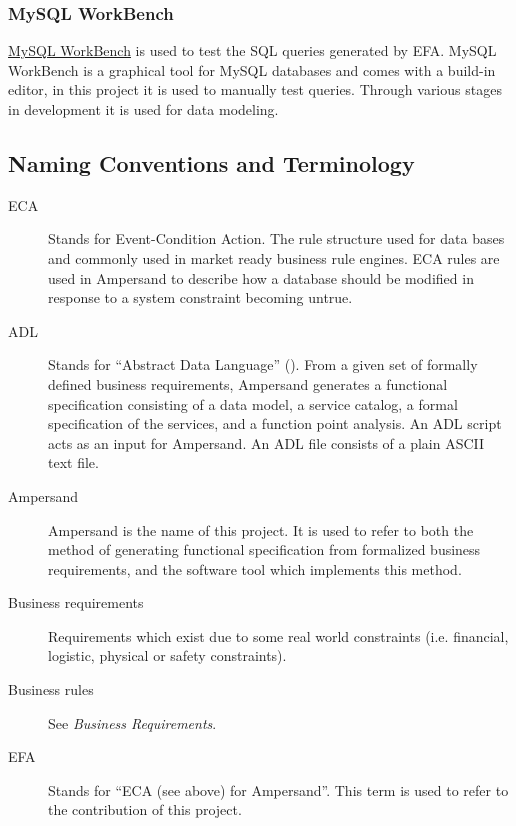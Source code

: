 \documentclass[journal,12pt,onecolumn,draftclsnofoot]{article}
\let\Oldsubsection\subsection
\renewcommand{\subsection}{\FloatBarrier\Oldsubsection}
\let\Oldsubsubsection\subsubsection
\renewcommand{\subsubsection}{\FloatBarrier\Oldsubsubsection}
\begin{document}
\subsubsection*{MySQL WorkBench}
\noindent
\href{https://dev.mysql.com/doc/workbench/en/}{MySQL WorkBench} is used to test 
the SQL queries generated by EFA. MySQL WorkBench is a graphical tool for MySQL 
databases and comes with a build-in editor, in this project it is used to 
manually test queries. Through various stages in development it is used for 
data modeling.

\subsection{Naming Conventions and Terminology}\label{sec:Naming} 
\begin{description}
    \item[ECA] Stands for Event-Condition Action. The rule structure used for 
    data
    bases and commonly used in market ready business rule engines. ECA rules are
    used in Ampersand to describe how a database should be modified in response 
    to
    a system constraint becoming untrue. 
    
    \item [ADL] Stands for ``Abstract Data Language'' (\cite[13]{derFun}). From 
    a
    given set of formally defined business requirements, Ampersand generates a
    functional specification consisting of a data model, a service catalog, a
    formal specification of the services, and a function point analysis. An ADL
    script acts as an input for Ampersand. An ADL file consists of a plain ASCII
    text file.
    
    \item [Ampersand] Ampersand is the name of this project. It is used to 
    refer to
    both the method of generating functional specification from formalized
    business requirements, and the software tool which implements this method.
    
    \item [Business requirements] Requirements which exist due to some real 
    world 
    constraints (i.e. financial, logistic, physical or safety constraints). 
    
    \item [Business rules] See \emph{Business Requirements}.
    
    \item [EFA] Stands for ``ECA (see above) for Ampersand''. This term is used 
    to 
    refer to the contribution of this project. 
    

\end{description}
\end{document}
